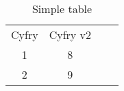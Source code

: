 \begin{table}[h]
\begin{tabular}{|c|c|ll}
\cline{1-2}
Cyfry & Cyfry v2 &    \\ \cline{1-2}
1 & 8   \\
2 & 9  \\ \cline{1-2}
\end{tabular}
\centering
\label{tab:amika_tab}
\caption{Simple table}
\end{table}